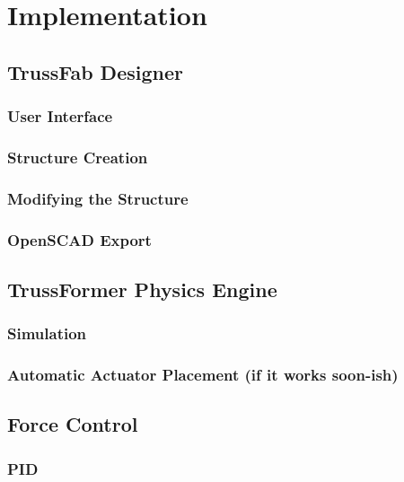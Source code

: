 \chapter{Implementation}\label{ch:implementation}
\section{TrussFab Designer}
\subsection{User Interface}
\subsection{Structure Creation}
\subsection{Modifying the Structure}
\subsection{OpenSCAD Export}\label{sec:openscad_impl}
\section{TrussFormer Physics Engine}
\subsection{Simulation}
\subsection{Automatic Actuator Placement (if it works soon-ish)}
\section{Force Control}
\subsection{PID}
